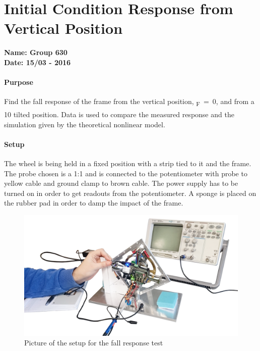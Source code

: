\chapter{Initial Condition Response from Vertical Position}\label{app:fallResponseAppendix} 
\textbf{Name: Group 630}\\
\textbf{Date: 15/03 - 2016}

\subsubsection{Purpose}
Find the fall response of the frame from the vertical position, \si{\theta_F=0}, and from a \si{10^\circ} tilted position.
Data is used to compare the measured response and the simulation given by the theoretical nonlinear model.

\subsubsection{Setup}
The wheel is being held in a fixed position with a strip tied to it and the frame. The probe chosen is a 1:1 and is connected to the potentiometer with probe to yellow cable and ground clamp to brown cable. The power supply has to be turned on in order to get readouts from the potentiometer. A sponge is placed on the rubber pad in order to damp the impact of the frame.
\begin{figure}[H]                                   
	\centering                                        
	\includegraphics[scale=0.3]{figures/stepResponseSetup2}
	\caption{Picture of the setup for the fall response test}
	\label{stepResponseTestPicture} 
\end{figure}              

